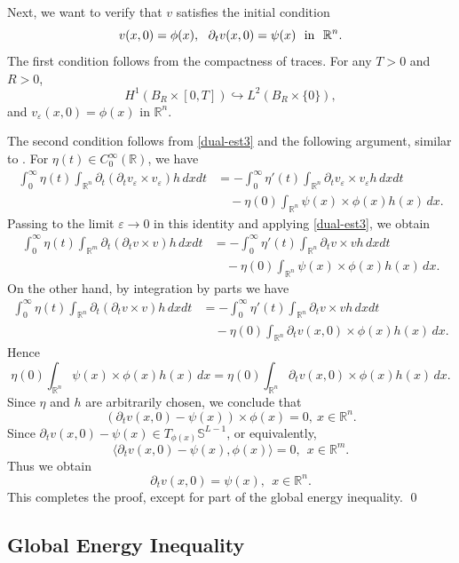 \documentclass[12pt,twoside,reqno]{amsart}
\theoremstyle{definition}              %
\theoremstyle{remark}                  %
\newcommand{\eps}{\varepsilon}
\renewcommand{\1}{\mathbbm{1}}                                      %
\numberwithin{equation}{section}
\numberwithin{definition}{section}
\numberwithin{theorem}{section}
\numberwithin{remark}{section}
\begin{document}
Next, we want to verify that $v$ satisfies the initial condition
\[
v(x,0)=\phi(x),\ \ \partial_tv(x,0)=\psi(x) 
\ \ {\rm{in}}\ \ \mathbb{R}^n.
\]
The first condition follows from the compactness of traces. For any $T>0$ and $R>0$, 
$$
H^1(B_R\times [0,T])\hookrightarrow L^2(B_R\times\{0\}),
$$
and $v_\eps(x,0)=\phi(x)$ in $\mathbb{R}^n$.

The second condition follows from \eqref{dual-est3} and the following argument, similar to \cite[page 1571]{Serra-Tilli2012}. For $\eta(t)\in C_0^\infty(\mathbb{R})$, we have
\begin{align*}
\int_0^\infty\eta(t)\int_{\mathbb{R}^n}
\partial_t(\partial_tv_\eps\times v_\eps) h\,dxdt
&=-\int_0^\infty\eta'(t)\int_{\mathbb{R}^n}
\partial_tv_\eps\times v_\eps h\,dxdt\\
&\quad-\eta(0)
\int_{\mathbb{R}^n}\psi(x)\times \phi(x) h(x)\,dx.
\end{align*}
Passing to the limit $\eps\to 0$ in this identity and applying \eqref{dual-est3}, we obtain
\begin{align*}
\int_0^\infty\eta(t)\int_{\mathbb{R}^m}
\partial_t(\partial_tv\times v) h\,dxdt
&=-\int_0^\infty\eta'(t)\int_{\mathbb{R}^n}
\partial_tv\times v h\,dxdt\\
&\quad-\eta(0)
\int_{\mathbb{R}^n}\psi(x)\times \phi(x) h(x)\,dx.
\end{align*}
On the other hand, by integration by parts we have
\begin{align*}
\int_0^\infty\eta(t)\int_{\mathbb{R}^n}
\partial_t(\partial_tv\times v)h\,dxdt
&=-\int_0^\infty\eta'(t)\int_{\mathbb{R}^n}
\partial_tv\times v h\,dxdt\\
&\quad-\eta(0)\int_{\mathbb{R}^n}
\partial_tv(x,0)\times \phi (x) h(x)\,dx.
\end{align*}
Hence
\[
\eta(0)
\int_{\mathbb{R}^n}\psi(x)\times \phi(x) h(x)\,dx
=\eta(0)\int_{\mathbb{R}^n}
\partial_tv(x,0)\times \phi (x) h(x)\,dx.
\]
Since $\eta$ and $h$ are arbitrarily chosen,
we conclude that
\[
(\partial_tv(x,0)-\psi(x))\times \phi(x)=0,
\ x\in\mathbb{R}^n.
\] 
Since $\partial_tv(x,0)-\psi(x)\in T_{\phi(x)}\mathbb{S}^{L-1}$, or equivalently, 
\[
\langle \partial_tv(x,0)-\psi(x),\phi(x)\rangle=0,\ \
x\in\mathbb{R}^m.
\]
Thus we obtain
\[
\partial_tv(x,0)=\psi(x),\ \ x\in\mathbb{R}^n.
\]
This completes the proof, except for part of the global energy inequality. 
\qed

\medskip
\subsection{Global Energy Inequality}
\end{document}
